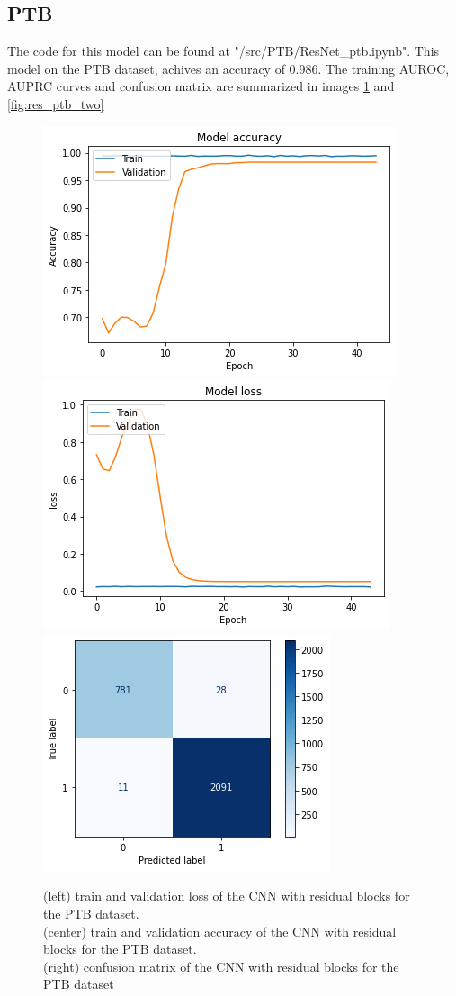 \documentclass[11pt]{scrartcl}
\begin{document}
\subsection{PTB}
The code for this model can be found at "/src/PTB/ResNet\_ptb.ipynb".
This model on the PTB dataset, achives an accuracy of 0.986. The training AUROC, AUPRC curves and confusion matrix  are summarized in images \ref{fig:res_ptb_three} and \ref{fig:res_ptb_two}
\begin{figure}[htp]
\centering
\includegraphics[width=.30\textwidth]{../models_performance_graphs/ptb/res_net_ptb_accuracy.png}\hfill
\includegraphics[width=.30\textwidth]{../models_performance_graphs/ptb/res_net_ptb_loss.png}\hfill
\includegraphics[width=.30\textwidth]{../models_performance_graphs/ptb/res_net_ptb_confusion.png}
\caption{(left) train and validation loss of the CNN with residual blocks for the PTB dataset. \\ (center) train and validation accuracy of the CNN with residual blocks for the PTB dataset. \\(right) confusion matrix of the CNN with residual blocks for the PTB dataset}
\label{fig:res_ptb_three}
\end{figure}
\end{document}
